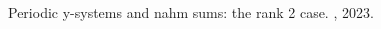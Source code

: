 \documentclass[10pt,a4paper,sans]{moderncv}        %
\begin{document}

%
%



\renewcommand{\refname}{Preprints}
\begin{thebibliography}{1}

   Periodic y-systems and nahm sums: the rank 2 case.
, 2023.

\end{thebibliography}
\end{document}
